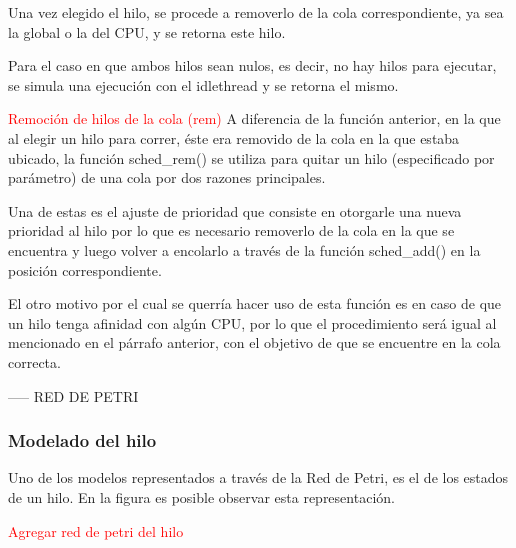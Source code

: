Una vez elegido el hilo, se procede a removerlo de la cola correspondiente, ya sea la global o la del CPU, y se retorna este hilo.

Para el caso en que ambos hilos sean nulos, es decir, no hay hilos para ejecutar, se simula una ejecución con el idlethread y se retorna el mismo.

\textcolor{red}{Remoción de hilos de la cola (rem)}
A diferencia de la función anterior, en la que al elegir un hilo para correr, éste era removido de la cola en la que estaba ubicado, la función sched\_rem() se utiliza para quitar un hilo (especificado por parámetro) de una cola por dos razones principales.\par

Una de estas es el ajuste de prioridad que consiste en otorgarle una nueva prioridad al hilo por lo que es necesario removerlo de la cola en la que se encuentra y luego volver a encolarlo a través de la función sched\_add() en la posición correspondiente.\par

El otro motivo por el cual se querría hacer uso de esta función es en caso de que un hilo tenga afinidad con algún CPU, por lo que el procedimiento será igual al mencionado en el párrafo anterior, con el objetivo de que se encuentre en la cola correcta.\par


----- RED DE PETRI

\subsubsection{Modelado del hilo}
Uno de los modelos representados a través de la Red de Petri, es el de los estados de un hilo. En la figura es posible observar esta representación.\par

\textcolor{red}{Agregar red de petri del hilo}

